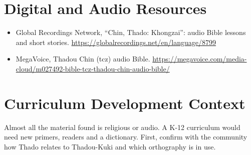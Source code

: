 \documentclass[12pt]{article}
\begin{document}
\section{Digital and Audio Resources}
\begin{itemize}
\item Global Recordings Network, ``Chin, Thado: Khongzai'': audio Bible lessons and short stories. \url{https://globalrecordings.net/en/language/8799}
\item MegaVoice, Thadou Chin (tcz) audio Bible. \url{https://megavoice.com/media-cloud/m027492-bible-tcz-thadou-chin-audio-bible/}
\end{itemize}

\section{Curriculum Development Context}
Almost all the material found is religious or audio. A K-12 curriculum would need new primers, readers and a dictionary. First, confirm with the community how Thado relates to Thadou-Kuki and which orthography is in use.
\end{document}
